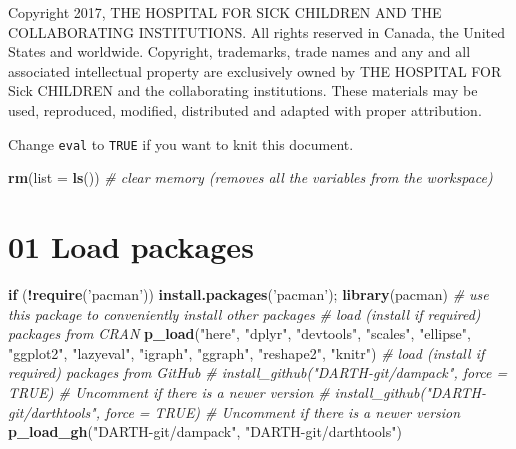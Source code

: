 \documentclass[
]{article}
\newenvironment{Shaded}{\begin{snugshade}}{\end{snugshade}}
\newcommand{\CommentTok}[1]{\textcolor[rgb]{0.56,0.35,0.01}{\textit{#1}}}
\newcommand{\ControlFlowTok}[1]{\textcolor[rgb]{0.13,0.29,0.53}{\textbf{#1}}}
\newcommand{\DataTypeTok}[1]{\textcolor[rgb]{0.13,0.29,0.53}{#1}}
\newcommand{\KeywordTok}[1]{\textcolor[rgb]{0.13,0.29,0.53}{\textbf{#1}}}
\newcommand{\NormalTok}[1]{#1}
\newcommand{\OperatorTok}[1]{\textcolor[rgb]{0.81,0.36,0.00}{\textbf{#1}}}
\newcommand{\StringTok}[1]{\textcolor[rgb]{0.31,0.60,0.02}{#1}}
\begin{document}
Copyright 2017, THE HOSPITAL FOR SICK CHILDREN AND THE COLLABORATING
INSTITUTIONS. All rights reserved in Canada, the United States and
worldwide. Copyright, trademarks, trade names and any and all associated
intellectual property are exclusively owned by THE HOSPITAL FOR Sick
CHILDREN and the collaborating institutions. These materials may be
used, reproduced, modified, distributed and adapted with proper
attribution.

\newpage

Change \texttt{eval} to \texttt{TRUE} if you want to knit this document.

\begin{Shaded}
\begin{Highlighting}[]
\KeywordTok{rm}\NormalTok{(}\DataTypeTok{list =} \KeywordTok{ls}\NormalTok{())      }\CommentTok{# clear memory (removes all the variables from the workspace)}
\end{Highlighting}
\end{Shaded}

\hypertarget{load-packages}{%
\section{01 Load packages}\label{load-packages}}

\begin{Shaded}
\begin{Highlighting}[]
\ControlFlowTok{if}\NormalTok{ (}\OperatorTok{!}\KeywordTok{require}\NormalTok{(}\StringTok{'pacman'}\NormalTok{)) }\KeywordTok{install.packages}\NormalTok{(}\StringTok{'pacman'}\NormalTok{); }\KeywordTok{library}\NormalTok{(pacman) }\CommentTok{# use this package to conveniently install other packages}
 \CommentTok{# load (install if required) packages from CRAN}
 \KeywordTok{p_load}\NormalTok{(}\StringTok{"here"}\NormalTok{, }\StringTok{"dplyr"}\NormalTok{, }\StringTok{"devtools"}\NormalTok{, }\StringTok{"scales"}\NormalTok{, }\StringTok{"ellipse"}\NormalTok{, }\StringTok{"ggplot2"}\NormalTok{, }\StringTok{"lazyeval"}\NormalTok{, }\StringTok{"igraph"}\NormalTok{, }\StringTok{"ggraph"}\NormalTok{, }\StringTok{"reshape2"}\NormalTok{, }\StringTok{"knitr"}\NormalTok{)                                               }
 \CommentTok{# load (install if required) packages from GitHub}
\CommentTok{# install_github("DARTH-git/dampack", force = TRUE) # Uncomment if there is a newer version}
\CommentTok{# install_github("DARTH-git/darthtools", force = TRUE) # Uncomment if there is a newer version}
\KeywordTok{p_load_gh}\NormalTok{(}\StringTok{"DARTH-git/dampack"}\NormalTok{, }\StringTok{"DARTH-git/darthtools"}\NormalTok{)}
\end{Highlighting}
\end{Shaded}
\end{document}
